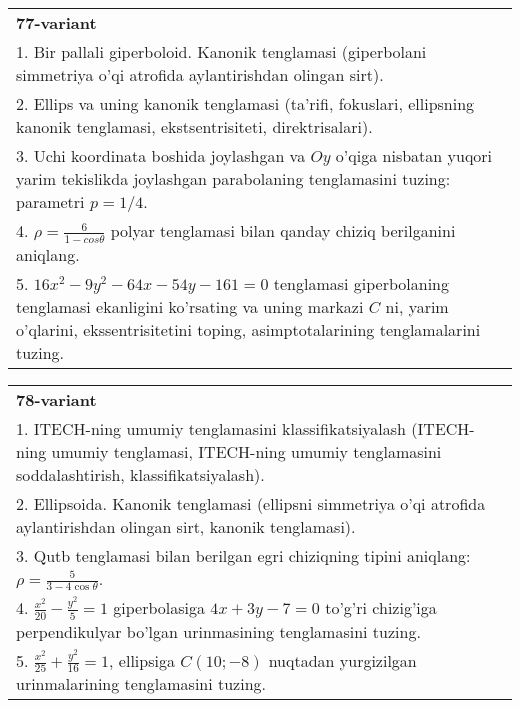 \documentclass{article}
\begin{document}
\begin{tabular}{m{17cm}}
\textbf{77-variant}\\
1. Bir pallali giperboloid. Kanonik tenglamasi (giperbolani simmetriya o'qi atrofida aylantirishdan olingan sirt).\\

2. Ellips va uning kanonik tenglamasi (ta'rifi, fokuslari, ellipsning kanonik tenglamasi, ekstsentrisiteti, direktrisalari).\\

3. Uchi koordinata boshida joylashgan va $Oy$ o'qiga nisbatan yuqori yarim tekislikda joylashgan parabolaning tenglamasini tuzing: parametri $p=1/4$.\\

4. $\rho = \frac{6}{1 - cos\theta}$ polyar tenglamasi bilan qanday chiziq berilganini aniqlang.  \\

5. $16x^{2} - 9y^{2} - 64x - 54y - 161 = 0$ tenglamasi giperbolaning tenglamasi ekanligini ko'rsating va uning markazi $C$ ni, yarim o'qlarini, ekssentrisitetini toping, asimptotalarining tenglamalarini tuzing.  
\end{tabular}
\vspace{1cm}


\begin{tabular}{m{17cm}}
\textbf{78-variant}\\
1. ITECH-ning umumiy tenglamasini klassifikatsiyalash (ITECH-ning umumiy tenglamasi, ITECH-ning umumiy tenglamasini soddalashtirish, klassifikatsiyalash).\\

2. Ellipsoida. Kanonik tenglamasi (ellipsni simmetriya o'qi atrofida aylantirishdan olingan sirt, kanonik tenglamasi).\\

3. Qutb tenglamasi bilan berilgan egri chiziqning tipini aniqlang: $\rho=\frac{5}{3-4\cos\theta}$.\\

4. $\frac{x^{2}}{20} - \frac{y^{2}}{5} = 1$ giperbolasiga $4x + 3y - 7 = 0$ to'g'ri chizig'iga perpendikulyar bo'lgan urinmasining tenglamasini tuzing.  \\

5. $\frac{x^{2}}{25} + \frac{y^{2}}{16} = 1$, ellipsiga $C(10; - 8)$ nuqtadan yurgizilgan urinmalarining tenglamasini tuzing.  
\end{tabular}
\vspace{1cm}
\end{document}
